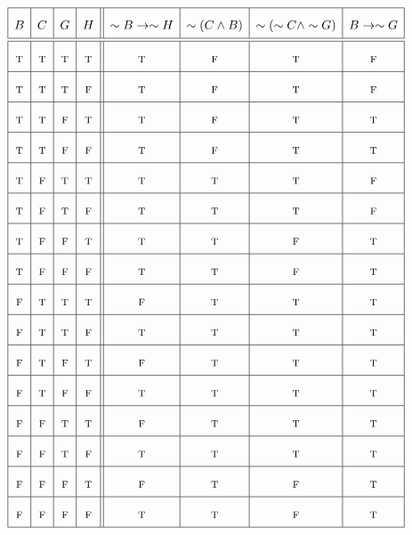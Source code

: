 \documentclass{article}
\newenvironment{Solution}
{\noindent\color{red}}
{\newline}
\begin{document}
\begin{Solution}
    $$
    \renewcommand{\arraystretch}{2}
    \begin{array}{|c|c|c|c||c|c|c|c|}
    \hline
    B&C&G&H&\sim B \rightarrow \sim H&\sim (C \land B)&\sim (\sim C \land \sim G)&B \rightarrow \sim G \\
    \hline\hline
    \textsc{t}&\textsc{t}&\textsc{t}&\textsc{t}&\textsc{t}&\textsc{f}&\textsc{t}&\textsc{f} \\
    \hline
    \textsc{t}&\textsc{t}&\textsc{t}&\textsc{f}&\textsc{t}&\textsc{f}&\textsc{t}&\textsc{f} \\
    \hline
    \textsc{t}&\textsc{t}&\textsc{f}&\textsc{t}&\textsc{t}&\textsc{f}&\textsc{t}&\textsc{t} \\
    \hline
    \textsc{t}&\textsc{t}&\textsc{f}&\textsc{f}&\textsc{t}&\textsc{f}&\textsc{t}&\textsc{t} \\
    \hline
    \textsc{t}&\textsc{f}&\textsc{t}&\textsc{t}&\textsc{t}&\textsc{t}&\textsc{t}&\textsc{f} \\
    \hline
    \textsc{t}&\textsc{f}&\textsc{t}&\textsc{f}&\textsc{t}&\textsc{t}&\textsc{t}&\textsc{f} \\
    \hline
    \textsc{t}&\textsc{f}&\textsc{f}&\textsc{t}&\textsc{t}&\textsc{t}&\textsc{f}&\textsc{t} \\
    \hline
    \textsc{t}&\textsc{f}&\textsc{f}&\textsc{f}&\textsc{t}&\textsc{t}&\textsc{f}&\textsc{t} \\
    \hline
    \textsc{f}&\textsc{t}&\textsc{t}&\textsc{t}&\textsc{f}&\textsc{t}&\textsc{t}&\textsc{t} \\
    \hline
    \textsc{f}&\textsc{t}&\textsc{t}&\textsc{f}&\textsc{t}&\textsc{t}&\textsc{t}&\textsc{t} \\
    \hline
    \textsc{f}&\textsc{t}&\textsc{f}&\textsc{t}&\textsc{f}&\textsc{t}&\textsc{t}&\textsc{t} \\
    \hline
    \textsc{f}&\textsc{t}&\textsc{f}&\textsc{f}&\textsc{t}&\textsc{t}&\textsc{t}&\textsc{t} \\
    \hline
    \textsc{f}&\textsc{f}&\textsc{t}&\textsc{t}&\textsc{f}&\textsc{t}&\textsc{t}&\textsc{t} \\
    \hline
    \textsc{f}&\textsc{f}&\textsc{t}&\textsc{f}&\textsc{t}&\textsc{t}&\textsc{t}&\textsc{t} \\
    \hline
    \textsc{f}&\textsc{f}&\textsc{f}&\textsc{t}&\textsc{f}&\textsc{t}&\textsc{f}&\textsc{t} \\
    \hline
    \textsc{f}&\textsc{f}&\textsc{f}&\textsc{f}&\textsc{t}&\textsc{t}&\textsc{f}&\textsc{t} \\
    \hline
    
\end{array}
    $$

    \phantom{ }
\end{Solution}
\end{document}
